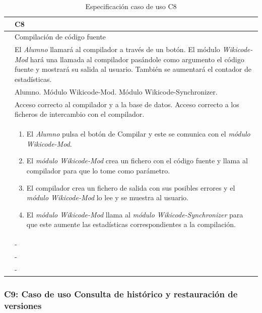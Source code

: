 \begin{table}[h]
\centering
\begin{tabular}{ | p{} | p{} | }
	\hline
	\cellcolor[gray]{.8}{ID} & C8 \\
	\hline 
	\cellcolor[gray]{.8}{Nombre} & Compilación de código fuente \\
	\hline
	\cellcolor[gray]{.8}{Descripción} & El \emph{Alumno} llamará al compilador a través de un botón. El módulo \emph{Wikicode-Mod} hará una llamada al compilador pasándole como argumento el código fuente y mostrará su salida al usuario. También se aumentará el contador de estadísticas. \\
	\hline
	\cellcolor[gray]{.8}{Actores} &  Alumno. Módulo Wikicode-Mod. Módulo Wikicode-Synchronizer.\\
	\hline
	\cellcolor[gray]{.8}{Asunciones} & Acceso correcto al compilador y a la base de datos. Acceso correcto a los ficheros de intercambio con el compilador. \\
	\hline
	\cellcolor[gray]{.8}{Pasos} & \begin{enumerate}
		\item El \emph{Alumno} pulsa el botón de Compilar y este se comunica con el \emph{módulo Wikicode-Mod}. 
		\item El \emph{módulo Wikicode-Mod} crea un fichero con el código fuente y llama al compilador para que lo tome como parámetro.
		\item El compilador crea un fichero de salida con sus posibles errores y el \emph{módulo Wikicode-Mod} lo lee y se muestra al usuario.
		\item El \emph{módulo Wikicode-Mod} llama al \emph{módulo Wikicode-Synchronizer} para que este aumente las estadísticas correspondientes a la compilación.
		\end{enumerate} \\
	\hline
	\cellcolor[gray]{.8}{Variaciones} & - \\
	\hline
	\cellcolor[gray]{.8}{Requisitos no funcionales} & - \\
	\hline
	\cellcolor[gray]{.8}{Cuestiones} & - \\
	\hline
	
\end{tabular}
\caption{Especificación caso de uso C8}
\end{table}

\newpage
\subsubsection{C9: Caso de uso Consulta de histórico y restauración de versiones}

